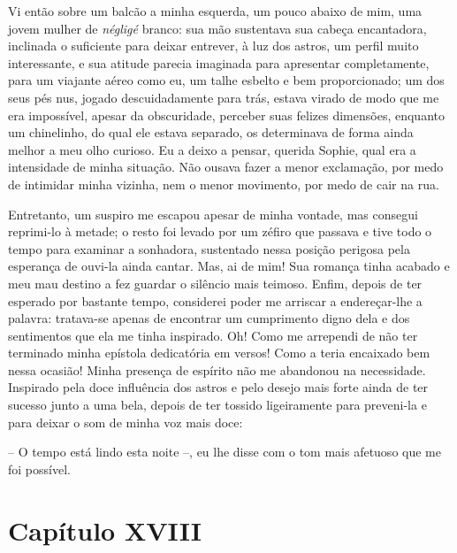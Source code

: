  Vi então sobre um balcão a minha esquerda, um pouco abaixo de mim, uma
jovem mulher de \textit{négligé} branco: sua mão sustentava sua cabeça
encantadora, inclinada o suficiente para deixar entrever, à luz dos
astros, um perfil muito interessante, e sua atitude parecia imaginada
para apresentar completamente, para um viajante aéreo como eu, um talhe
esbelto e bem proporcionado; um dos seus pés nus, jogado
descuidadamente para trás, estava virado de modo que me era impossível,
apesar da obscuridade, perceber suas felizes dimensões, enquanto um
chinelinho, do qual ele estava separado, os determinava de forma ainda
melhor a meu olho curioso. Eu a deixo a pensar, querida Sophie, qual
era a intensidade de minha situação. Não ousava fazer a menor
exclamação, por medo de intimidar minha vizinha, nem o menor movimento,
por medo de cair na rua.

 Entretanto, um suspiro me escapou apesar de minha vontade, mas consegui
reprimi-lo à metade; o resto foi levado por um zéfiro que passava e
tive todo o tempo para examinar a sonhadora, sustentado nessa posição
perigosa pela esperança de ouvi-la ainda cantar. Mas, ai de mim! Sua
romança tinha acabado e meu mau destino a fez guardar o silêncio mais
teimoso. Enfim, depois de ter esperado por bastante tempo, considerei
poder me arriscar a endereçar-lhe a palavra: tratava-se apenas de
encontrar um cumprimento digno dela e dos sentimentos que ela me tinha
inspirado. Oh! Como me arrependi de não ter terminado minha epístola
dedicatória em versos! Como a teria encaixado bem nessa ocasião! Minha
presença de espírito não me abandonou na necessidade. Inspirado pela
doce influência dos astros e pelo desejo mais forte ainda de ter
sucesso junto a uma bela, depois de ter tossido ligeiramente para
preveni-la e para deixar o som de minha voz mais doce:

 -- O tempo está lindo esta noite --, eu lhe disse com o tom mais
afetuoso que me foi possível.

\section{Capítulo XVIII}

